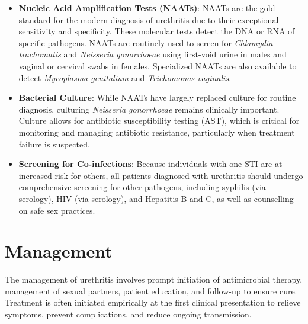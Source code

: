\begin{itemize}
    \item \textbf{Nucleic Acid Amplification Tests (NAATs)}: NAATs are the gold standard for the modern diagnosis of urethritis due to their exceptional sensitivity and specificity. These molecular tests detect the DNA or RNA of specific pathogens. NAATs are routinely used to screen for \textit{Chlamydia trachomatis} and \textit{Neisseria gonorrhoeae} using first-void urine in males and vaginal or cervical swabs in females. Specialized NAATs are also available to detect \textit{Mycoplasma genitalium} and \textit{Trichomonas vaginalis}.

    \item \textbf{Bacterial Culture}: While NAATs have largely replaced culture for routine diagnosis, culturing \textit{Neisseria gonorrhoeae} remains clinically important. Culture allows for antibiotic susceptibility testing (AST), which is critical for monitoring and managing antibiotic resistance, particularly when treatment failure is suspected.

    \item \textbf{Screening for Co-infections}: Because individuals with one STI are at increased risk for others, all patients diagnosed with urethritis should undergo comprehensive screening for other pathogens, including syphilis (via serology), HIV (via serology), and Hepatitis B and C, as well as counselling on safe sex practices.
\end{itemize}

\section*{Management}
The management of urethritis involves prompt initiation of antimicrobial therapy, management of sexual partners, patient education, and follow-up to ensure cure. Treatment is often initiated empirically at the first clinical presentation to relieve symptoms, prevent complications, and reduce ongoing transmission.


